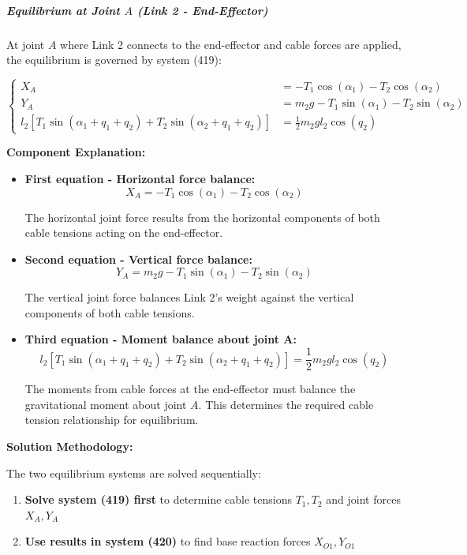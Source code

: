 \subparagraph{Equilibrium at Joint $A$ (Link 2 - End-Effector)}

At joint $A$ where Link 2 connects to the end-effector and cable forces are applied, the equilibrium is governed by system (419):

\begin{equation}
\left\{
\begin{aligned}
X_A &= -T_1 \cos(\alpha_1) - T_2 \cos(\alpha_2) \\
Y_A &= m_2 g - T_1 \sin(\alpha_1) - T_2 \sin(\alpha_2) \\
l_2[T_1 \sin(\alpha_1 + q_1 + q_2) + T_2 \sin(\alpha_2 + q_1 + q_2)] &= \frac{1}{2}m_2 g l_2 \cos(q_2)
\end{aligned}
\right.
\tag{419}
\end{equation}

\textbf{Component Explanation:}

\begin{itemize}
    \item \textbf{First equation - Horizontal force balance:}
    $$X_A = -T_1 \cos(\alpha_1) - T_2 \cos(\alpha_2)$$
    
    The horizontal joint force results from the horizontal components of both cable tensions acting on the end-effector.
    
    \item \textbf{Second equation - Vertical force balance:}
    $$Y_A = m_2 g - T_1 \sin(\alpha_1) - T_2 \sin(\alpha_2)$$
    
    The vertical joint force balances Link 2's weight against the vertical components of both cable tensions.
    
    \item \textbf{Third equation - Moment balance about joint A:}
    $$l_2[T_1 \sin(\alpha_1 + q_1 + q_2) + T_2 \sin(\alpha_2 + q_1 + q_2)] = \frac{1}{2}m_2 g l_2 \cos(q_2)$$
    
    The moments from cable forces at the end-effector must balance the gravitational moment about joint $A$. This determines the required cable tension relationship for equilibrium.
\end{itemize}

\textbf{Solution Methodology:}

The two equilibrium systems are solved sequentially:
\begin{enumerate}
    \item \textbf{Solve system (419) first} to determine cable tensions $T_1, T_2$ and joint forces $X_A, Y_A$
    \item \textbf{Use results in system (420)} to find base reaction forces $X_{O1}, Y_{O1}$
\end{enumerate}

